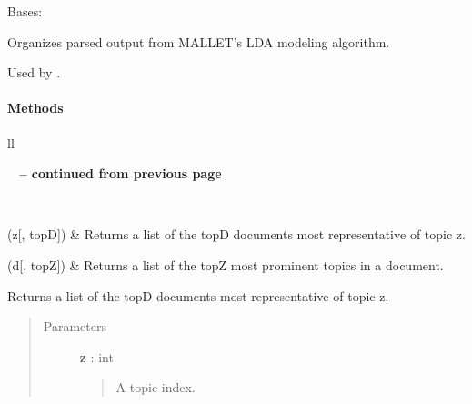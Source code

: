 \documentclass[letterpaper,10pt,english]{sphinxmanual}
\begin{document}

\begin{fulllineitems}
\label{tethne:tethne.data.LDAModel}
Bases: 

Organizes parsed output from MALLET's LDA modeling algorithm.

Used by {\hyperref[tethne.readers:module-tethne.readers.mallet]{}}.
\paragraph{Methods}

\begin{longtable}{ll}
\hline
\endfirsthead

%
{{\bfseries \tablename\ \thetable{} -- continued from previous page}} \\
\hline
\endhead

\hline {} \\ \hline
\endfoot

\hline
\endlastfoot


{\hyperref[tethne:tethne.data.LDAModel.docs_in_topic]{}}(z{[}, topD{]})
 & 
Returns a list of the topD documents most representative of topic z.
\\\hline

{\hyperref[tethne:tethne.data.LDAModel.topics_in_doc]{}}(d{[}, topZ{]})
 & 
Returns a list of the topZ most prominent topics in a document.
\\\hline
\end{longtable}


\begin{fulllineitems}
\label{tethne:tethne.data.LDAModel.docs_in_topic}
Returns a list of the topD documents most representative of topic z.
\begin{quote}\begin{description}
\item[{Parameters }] \leavevmode
\textbf{z} : int
\begin{quote}

A topic index.
\end{quote}


\end{description}
\end{quote}
\end{fulllineitems}
\end{fulllineitems}
\end{document}

